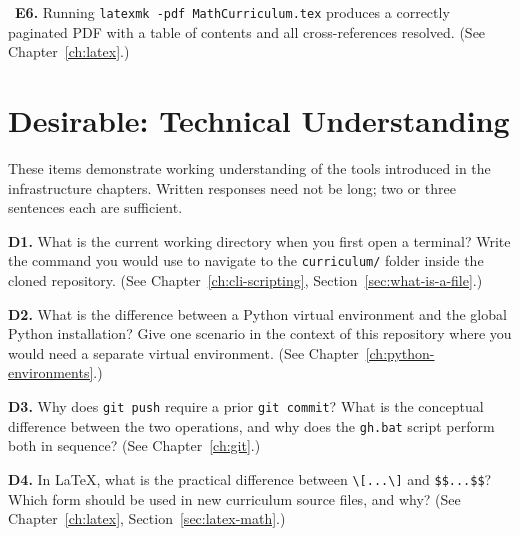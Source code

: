 \begin{Form}
\vs

\noindent\CheckBox[name=e6,width=0.4cm,height=0.4cm]{}~\textbf{E6.}
Running \texttt{latexmk -pdf MathCurriculum.tex} produces a
correctly paginated PDF with a table of contents and all
cross-references resolved.
(See Chapter~\ref{ch:latex}.)

\section{Desirable: Technical Understanding}
\label{sec:assess-desirable}

These items demonstrate working understanding of the tools
introduced in the infrastructure chapters. Written responses need
not be long; two or three sentences each are sufficient.

\vs

\noindent\textbf{D1.} What is the current working directory when you
first open a terminal? Write the command you would use to navigate
to the \texttt{curriculum/} folder inside the cloned repository.
(See Chapter~\ref{ch:cli-scripting},
Section~\ref{sec:what-is-a-file}.)\\[4pt]
\TextField[name=d1,width=\linewidth,height=2.5cm,multiline=true,
           bordercolor=black]{}

\vs

\noindent\textbf{D2.} What is the difference between a Python
virtual environment and the global Python installation? Give one
scenario in the context of this repository where you would need
a separate virtual environment.
(See Chapter~\ref{ch:python-environments}.)\\[4pt]
\TextField[name=d2,width=\linewidth,height=2.5cm,multiline=true,
           bordercolor=black]{}

\vs

\noindent\textbf{D3.} Why does \texttt{git push} require a prior
\texttt{git commit}? What is the conceptual difference between
the two operations, and why does the \texttt{gh.bat} script
perform both in sequence?
(See Chapter~\ref{ch:git}.)\\[4pt]
\TextField[name=d3,width=\linewidth,height=2.5cm,multiline=true,
           bordercolor=black]{}

\vs

\noindent\textbf{D4.} In \LaTeX{}, what is the practical difference
between \verb|\[...\]| and \verb|$$...$$|? Which form should be
used in new curriculum source files, and why?
(See Chapter~\ref{ch:latex}, Section~\ref{sec:latex-math}.)\\[4pt]
\TextField[name=d4,width=\linewidth,height=2.5cm,multiline=true,
           bordercolor=black]{}


\end{Form}
